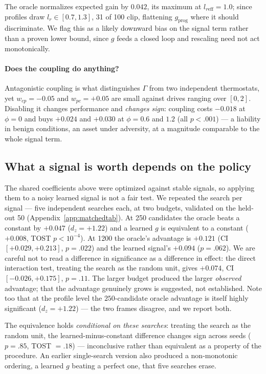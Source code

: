 \documentclass{article}
\begin{document}
The oracle normalizes expected gain by $0.042$, its maximum at $l_{r\text{eff}}{=}1.0$; since profiles draw $l_r\in[0.7,1.3]$, 31 of 100 clip, flattening $g_{\text{prog}}$ where it should discriminate. We flag this as a likely downward bias on the signal term rather than a proven lower bound, since $g$ feeds a closed loop and rescaling need not act monotonically.

\paragraph{Does the coupling do anything?} Antagonistic coupling is what distinguishes $\Gamma$ from two independent thermostats, yet $w_{cp}{=}-0.05$ and $w_{pc}{=}+0.05$ are small against drives ranging over $[0,2]$. Disabling it changes performance and \emph{changes sign}: coupling costs $-0.018$ at $\phi{=}0$ and buys $+0.024$ and $+0.030$ at $\phi{=}0.6$ and $1.2$ (all $p<.001$) --- a liability in benign conditions, an asset under adversity, at a magnitude comparable to the whole signal term.

\subsection{What a signal is worth depends on the policy}
\label{sec:matched}

The shared coefficients above were optimized against stable signals, so applying them to a noisy learned signal is not a fair test. We repeated the search per signal --- five independent searches each, at two budgets, validated on the held-out 50 (Appendix~\ref{app:matchedtab}). At 250 candidates the oracle beats a constant by $+0.047$ ($d_z{=}{+}1.22$) and a learned $g$ is equivalent to a constant ($+0.008$, TOST $p<10^{-4}$). At 1200 the oracle's advantage is $+0.121$ (CI $[+0.029,+0.213]$, $p{=}.022$) and the learned signal's $+0.094$ ($p{=}.062$). We are careful not to read a difference in significance as a difference in effect: the direct interaction test, treating the search as the random unit, gives $+0.074$, CI $[-0.026,+0.175]$, $p{=}.11$. The larger budget produced the larger \emph{observed} advantage; that the advantage genuinely grows is suggested, not established. Note too that at the profile level the $250$-candidate oracle advantage is itself highly significant ($d_z{=}{+}1.22$) --- the two frames disagree, and we report both.

The equivalence holds \emph{conditional on these searches}: treating the search as the random unit, the learned-minus-constant difference changes sign across seeds ($p{=}.85$, TOST $=.18$) --- inconclusive rather than equivalent as a property of the procedure. An earlier single-search version also produced a non-monotonic ordering, a learned $g$ beating a perfect one, that five searches erase.
\end{document}
